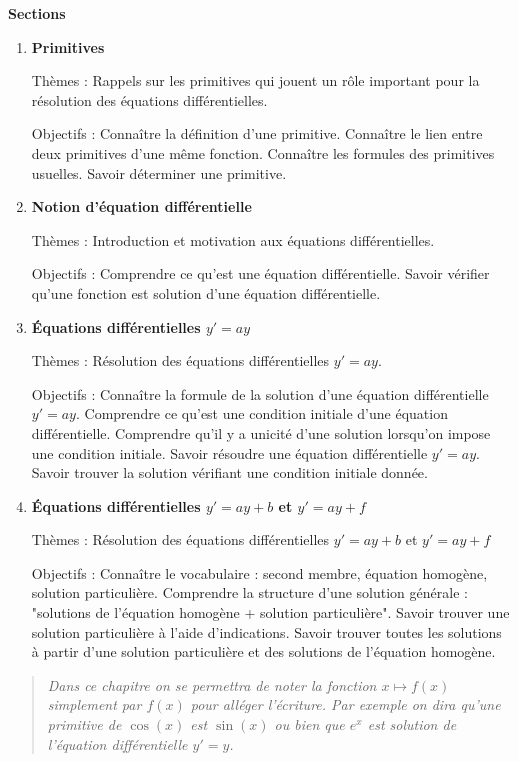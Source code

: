 \documentclass[11pt,a4paper]{report}
\begin{document}
\textbf{Sections}
\begin{enumerate}[label=\arabic*.]
  \item \textbf{Primitives}
  
  Thèmes : Rappels sur les primitives qui jouent un rôle important pour la résolution des équations différentielles.
  
  Objectifs : 
  Connaître la définition d'une primitive. 
  Connaître le lien entre deux primitives d'une même fonction. 
  Connaître les formules des primitives usuelles. 
  Savoir déterminer une primitive.
  
  
  \item \textbf{Notion d'équation différentielle}
  
  Thèmes : Introduction et motivation aux équations différentielles.

  Objectifs : 
  Comprendre ce qu'est une équation différentielle. 
  Savoir vérifier qu'une fonction est solution d'une équation différentielle.
  
  \item \textbf{\'Equations différentielles $y'=ay$}
    
  Thèmes : Résolution des équations différentielles $y'=ay$.
  
  Objectifs : 
  Connaître la formule de la solution d'une équation différentielle $y'=ay$.
  Comprendre ce qu'est une condition initiale d'une équation différentielle.
  Comprendre qu'il y a unicité d'une solution lorsqu'on impose une condition initiale.
  Savoir résoudre une équation différentielle $y'=ay$.
  Savoir trouver la solution vérifiant une condition initiale donnée.
  
  \item \textbf{\'Equations différentielles $y'=ay+b$ et $y'=ay+f$}
    
  Thèmes : Résolution des équations différentielles $y'=ay+b$ et $y'=ay+f$
  
  Objectifs : 
  Connaître le vocabulaire : second membre, équation homogène, solution particulière.
  Comprendre la structure d'une solution générale : "solutions de l'équation homogène + solution particulière".
  Savoir trouver une solution particulière à l'aide d'indications.
  Savoir trouver toutes les solutions à partir d'une solution particulière et des solutions de l'équation homogène.
  
\end{enumerate}


\bigskip
\bigskip

\begin{quote}
\center
\emph{Dans ce chapitre on se permettra de noter la fonction $x \mapsto f(x)$ simplement par $f(x)$ pour alléger l'écriture. Par exemple on dira qu'une primitive de $\cos(x)$ est $\sin(x)$ ou bien que $e^x$ est solution de l'équation différentielle $y'=y$.}
\end{quote}
\end{document}
